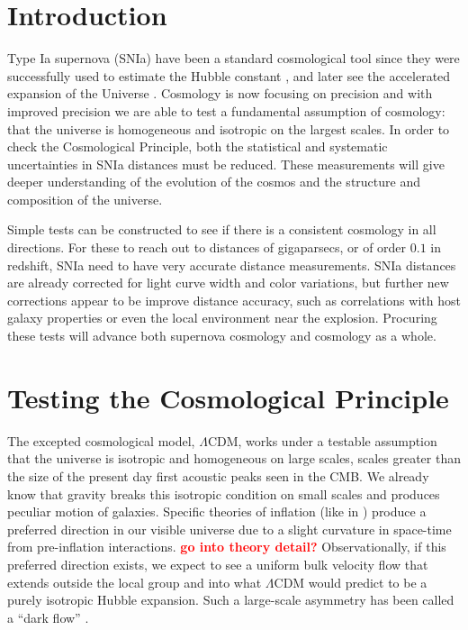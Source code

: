 \documentclass[apj, iop]{emulateapj}
\newcommand{\sn}{SNIa}
\newcommand{\todo}[1]{\textbf{\textcolor{red}{#1}}}
\begin{document}
\maketitle

\section{Introduction}\label{introduction} 

Type Ia supernova (\sn{}) have been a standard cosmological tool since they were
successfully used to estimate the Hubble constant \citep{Hamuy95,Riess95}, and
later see the accelerated expansion of the Universe
\citep{Riess98,Perlmutter99}. Cosmology is now focusing on precision and with
improved precision we are able to test a fundamental assumption of cosmology:
that the universe is homogeneous and isotropic on the largest scales. In order
to check the Cosmological Principle, both the statistical and systematic
uncertainties in \sn{} distances must be reduced. These measurements will give
deeper understanding of the evolution of the cosmos and the structure and
composition of the universe.

Simple tests can be constructed to see if there is a consistent cosmology in all
directions. For these to reach out to distances of gigaparsecs, or of order
$0.1$ in redshift, \sn{} need to have very accurate distance measurements. \sn{}
distances are already corrected for light curve width and color variations, but
further new corrections appear to be improve distance accuracy, such as
correlations with host galaxy properties or even the local environment near the
explosion. Procuring these tests will advance both supernova cosmology and
cosmology as a whole.

\section{Testing the Cosmological Principle}\label{testing-the-cosmological-principle}

The excepted cosmological model, $\Lambda$CDM, works under a testable assumption
that the universe is isotropic and homogeneous on large scales, scales greater
than the size of the present day first acoustic peaks seen in the CMB.
We already know that gravity breaks this isotropic condition on small scales and
produces peculiar motion of galaxies. Specific theories of inflation (like in
\cite{MersiniHoughton:2008io}) produce a preferred direction in our visible
universe due to a slight curvature in space-time from pre-inflation
interactions. \todo{go into theory detail?} Observationally, if this preferred
direction exists, we expect to see a uniform bulk velocity flow that extends
outside the local group and into what $\Lambda$CDM would predict to be a purely
isotropic Hubble expansion. Such a large-scale asymmetry has been called a
``dark flow'' \cite{MersiniHoughton:2008io}.
\end{document}
